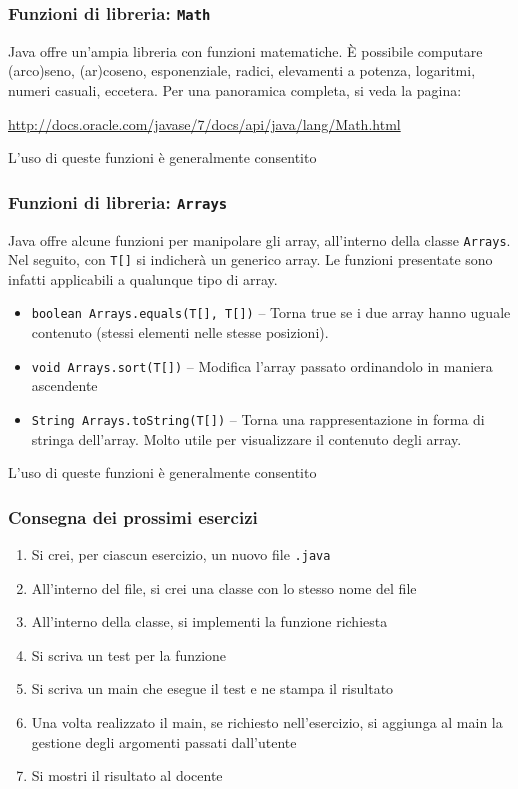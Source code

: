 \documentclass{beamer}
\begin{document}
\begin{frame}[fragile]
\frametitle{Funzioni di libreria: \texttt{Math}}
Java offre un'ampia libreria con funzioni matematiche. È possibile computare (arco)seno, (ar)coseno, esponenziale, radici, elevamenti a potenza, logaritmi, numeri casuali, eccetera. Per una panoramica completa, si veda la pagina:

\scriptsize{}
\url{http://docs.oracle.com/javase/7/docs/api/java/lang/Math.html}

\normalsize{}
L'uso di queste funzioni è generalmente consentito
\end{frame}

\begin{frame}[fragile]
\frametitle{Funzioni di libreria: \texttt{Arrays}}
Java offre alcune funzioni per manipolare gli array, all'interno della classe \texttt{Arrays}. Nel seguito, con \texttt{T[]} si indicherà un generico array. Le funzioni presentate sono infatti applicabili a qualunque tipo di array.
\begin{itemize}
 \item \texttt{boolean Arrays.equals(T[], T[])} -- Torna true se i due array hanno uguale contenuto (stessi elementi nelle stesse posizioni). 
 \item \texttt{void Arrays.sort(T[])} -- Modifica l'array passato ordinandolo in maniera ascendente
 \item \texttt{String Arrays.toString(T[])} -- Torna una rappresentazione in forma di stringa dell'array. Molto utile per visualizzare il contenuto degli array.
\end{itemize}
L'uso di queste funzioni è generalmente consentito
\end{frame}

\begin{frame}[fragile]
\frametitle{Consegna dei prossimi esercizi}
\begin{enumerate}
 \item Si crei, per ciascun esercizio, un nuovo file \texttt{.java}
 \item All'interno del file, si crei una classe con lo stesso nome del file
 \item All'interno della classe, si implementi la funzione richiesta
 \item Si scriva un test per la funzione
 \item Si scriva un main che esegue il test e ne stampa il risultato
 \item Una volta realizzato il main, se richiesto nell'esercizio, si aggiunga al main la gestione degli argomenti passati dall'utente
 \item Si mostri il risultato al docente
\end{enumerate}
\end{frame}
\end{document}
